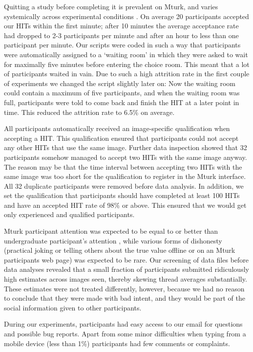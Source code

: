 \documentclass[9pt,a4paper,twocolumn,lineno]{article}
\begin{document}
Quitting a study before completing it is prevalent on Mturk, and varies systemically across experimental conditions \cite{zhou2016pitfall}. On average 20 participants accepted our HITs within the first minute; after 10 minutes the average acceptance rate had dropped to 2-3 participants per minute and after an hour to less than one participant per minute. Our scripts were coded in such a way that participants were automatically assigned to a ‘waiting room’ in which they were asked to wait for maximally five minutes before entering the choice room. This meant that a lot of participants waited in vain. Due to such a high attrition rate in the first couple of experiments we changed the script slightly later on: Now the waiting room could contain a maximum of five participants, and when the waiting room was full, participants were told to come back and finish the HIT at a later point in time. This reduced the attrition rate to 6.5\% on average.

All participants automatically received an image-specific qualification when accepting a HIT. This qualification ensured that participants could not accept any other HITs that use the same image. Further data inspection showed that 32 participants somehow managed to accept two HITs with the same image anyway. The reason may be that the time interval between accepting two HITs with the same image was too short for the qualification to register in the Mturk interface. All 32 duplicate participants were removed before data analysis. In addition, we set the qualification that participants should have completed at least 100 HITs and have an accepted HIT rate of 98\% or above. This ensured that we would get only experienced and qualified participants.

Mturk participant attention was expected to be equal to or better than undergraduate participant’s attention \cite{hauser2016attentive}, while various forms of dishonesty (practical joking or telling others about the true value offline or on an Mturk participants web page) was expected to be rare. Our screening of data files before data analyses revealed that a small fraction of participants submitted ridiculously high estimates across images seen, thereby skewing thread averages substantially. These estimates were not treated differently, however, because we had no reason to conclude that they were made with bad intent, and they would be part of the social information given to other participants.

During our experiments, participants had easy access to our email for questions and possible bug reports. Apart from some minor difficulties when typing from a mobile device (less than 1\%) participants had few comments or complaints.
\end{document}
